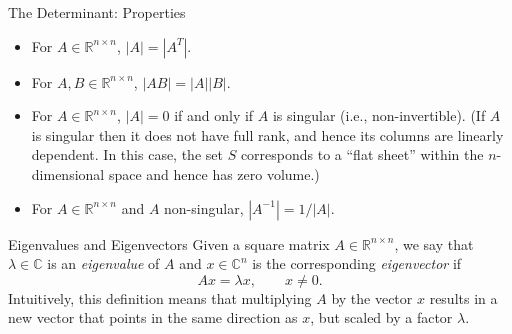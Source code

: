\documentclass[aspectratio=169,12pt]{beamer}
\begin{document}
\begin{frame}[t]{The Determinant: Properties}
  \vspace{0.18cm}
  {\small
  \begin{itemize}
    \setlength{\itemsep}{0.31cm}
    \item For $A\in\mathbb{R}^{n\times n}$, $|A|=|A^T|$.
    \item For $A,B\in\mathbb{R}^{n\times n}$, $|AB|=|A||B|$.
    \item For $A\in\mathbb{R}^{n\times n}$, $|A|=0$ if and only if $A$ is
          singular (i.e., non-invertible). (If $A$ is singular then it does not
          have full rank, and hence its columns are linearly dependent. In this
          case, the set $S$ corresponds to a ``flat sheet'' within the
          $n$-dimensional space and hence has zero volume.)
    \item For $A\in\mathbb{R}^{n\times n}$ and $A$ non-singular,
          $|A^{-1}|=1/|A|$.
  \end{itemize}
  }
\end{frame}

\begin{frame}[t]{Eigenvalues and Eigenvectors}
  \vspace{0.72cm}
  {\large
  Given a square matrix $A\in\mathbb{R}^{n\times n}$, we say that
  $\lambda\in\mathbb{C}$ is an \emph{eigenvalue} of $A$ and $x\in\mathbb{C}^{n}$
  is the corresponding \emph{eigenvector} if
  \[
    Ax=\lambda x,\qquad x\ne0.
  \]
  \vspace{0.45cm}
  Intuitively, this definition means that multiplying $A$ by the vector $x$
  results in a new vector that points in the same direction as $x$, but scaled by
  a factor $\lambda$.
  }
\end{frame}
\end{document}
